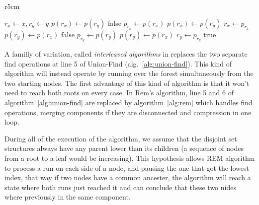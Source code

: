 \documentclass[12px]{article}
\begin{document}
        \setlength\intextsep{0pt}
        \begin{wrapfigure}{r}{5cm}
          \centering
          \begin{minipage}{\linewidth}
            \begin{algorithm}[H]
              \caption{Rem's algorithm}%
              \label{alg:rem}
              \begin{algorithmic}[1]
                \State $r_x \gets x, r_y \gets y$
                      \State $p(r_x) \gets p(r_y)$
                      \State \Return false
                    \EndIf
                    \State $p_{r_x} \gets p(r_x)$
                    \State $p(r_x) \gets p(r_y)$
                    \State $r_x \gets p_{r_x}$
                  \Else
                      \State $p(r_y) \gets p(r_x)$
                      \State \Return false
                    \EndIf
                    \State $p_{r_y} \gets p(r_y)$
                    \State $p(r_y) \gets p(r_x)$
                    \State $r_y \gets p_{r_y}$
                  \EndIf
                \EndWhile
                \State \Return true
              \end{algorithmic}
            \end{algorithm}
          \end{minipage}
        \end{wrapfigure}

      A familly of variation, called \emph{interleaved algorithms} in  replaces the two separate find operations at line 5 of Union-Find (alg.~\ref{alg:union-find}). This kind of algorithm will instead operate by running over the forest simultaneously from the two starting nodes. The first advantage of this kind of algorithm is that it won't need to reach both roots on every case.
      In Rem's algorithm, line 5 and 6 of algorithm~\ref{alg:union-find} are replaced by algorithm~\ref{alg:rem} which handles find operations, merging components if they are disconnected and compression in one loop.

      During all of the execution of the algorithm, we assume that the disjoint set structures always have any parent lower than its children (a sequence of nodes from a root to a leaf would be increasing).
      This hypothesis allows REM algorithm to process a run on each side of a node, and pausing the one that got the lowest index, that way if two nodes have a common ancester, the algorithm will reach a state where both runs just reached it and can conclude that these two nides where previously in the same component.
\end{document}
